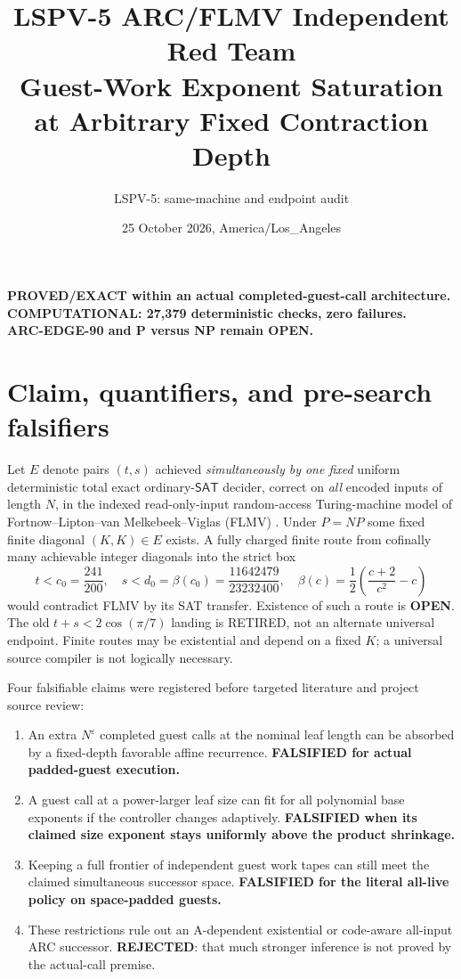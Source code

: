\documentclass[11pt]{article}
\title{LSPV-5 ARC/FLMV Independent Red Team\\
\large Guest-Work Exponent Saturation at Arbitrary Fixed Contraction Depth}
\author{LSPV-5: same-machine and endpoint audit}
\date{25 October 2026, America/Los\_Angeles}
\newcommand{\SAT}{\mathsf{SAT}}
\newcommand{\OPEN}{\textbf{OPEN}}
\begin{document}
\maketitle
\begin{center}
\textbf{PROVED/EXACT within an actual completed-guest-call architecture.}\\
\textbf{COMPUTATIONAL: 27,379 deterministic checks, zero failures.}\\
\textbf{ARC-EDGE-90 and P versus NP remain OPEN.}
\end{center}

\section{Claim, quantifiers, and pre-search falsifiers}
Let $E$ denote pairs $(t,s)$ achieved \emph{simultaneously by one fixed}
uniform deterministic total exact ordinary-$\SAT$ decider, correct on \emph{all}
encoded inputs of length $N$, in the indexed read-only-input random-access
Turing-machine model of Fortnow--Lipton--van Melkebeek--Viglas (FLMV)
\cite{flmv}. Under $P=NP$ some fixed finite diagonal $(K,K)\in E$ exists.
A fully charged finite route from cofinally many achievable integer diagonals
into the strict box
\[
 t< c_0=\frac{241}{200},\quad
 s<d_0=\beta(c_0)=\frac{11642479}{23232400},\quad
 \beta(c)=\frac12\left(\frac{c+2}{c^2}-c\right)
\]
would contradict FLMV by its SAT transfer. Existence of such a route is
\OPEN{}. The old $t+s<2\cos(\pi/7)$ landing is RETIRED, not an alternate
universal endpoint. Finite routes may be existential and depend on a fixed
$K$; a universal source compiler is not logically necessary.

Four falsifiable claims were registered before targeted literature and project
source review:
\begin{enumerate}
\item An extra $N^{\varepsilon}$ completed guest calls at the nominal
leaf length can be absorbed by a fixed-depth favorable affine recurrence.
\textbf{FALSIFIED for actual padded-guest execution.}
\item A guest call at a power-larger leaf size can fit for all polynomial
base exponents if the controller changes adaptively. \textbf{FALSIFIED when
its claimed size exponent stays uniformly above the product shrinkage.}
\item Keeping a full frontier of independent guest work tapes can still meet
the claimed simultaneous successor space. \textbf{FALSIFIED for the literal
all-live policy on space-padded guests.}
\item These restrictions rule out an A-dependent existential or code-aware
all-input ARC successor. \textbf{REJECTED}: that much stronger inference is
not proved by the actual-call premise.
\end{enumerate}
\end{document}
